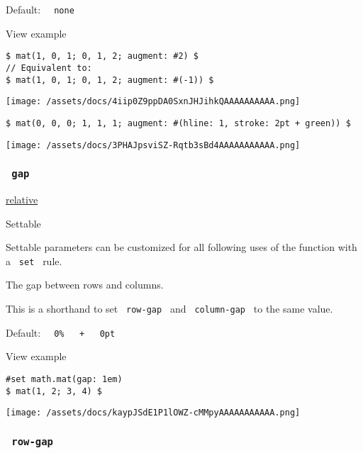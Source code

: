 Default: \texttt{\ }{\texttt{\ none\ }}\texttt{\ }


View example

\begin{verbatim}
$ mat(1, 0, 1; 0, 1, 2; augment: #2) $
// Equivalent to:
$ mat(1, 0, 1; 0, 1, 2; augment: #(-1)) $
\end{verbatim}

\texttt{[image: /assets/docs/4iip0Z9ppDA0SxnJHJihkQAAAAAAAAAA.png]}

\begin{verbatim}
$ mat(0, 0, 0; 1, 1, 1; augment: #(hline: 1, stroke: 2pt + green)) $
\end{verbatim}

\texttt{[image: /assets/docs/3PHAJpsviSZ-Rqtb3sBd4AAAAAAAAAAA.png]}

\subsubsection{\texorpdfstring{\texttt{\ gap\ }}{ gap }}\label{parameters-gap}

\href{/docs/reference/layout/relative/}{relative}

{{ Settable }}

\label{parameters-gap-settable-tooltip}
Settable parameters can be customized for all following uses of the
function with a \texttt{\ set\ } rule.

The gap between rows and columns.

This is a shorthand to set \texttt{\ row-gap\ } and
\texttt{\ column-gap\ } to the same value.

Default:
\texttt{\ }{\texttt{\ 0\%\ }}\texttt{\ }{\texttt{\ +\ }}\texttt{\ }{\texttt{\ 0pt\ }}\texttt{\ }


View example

\begin{verbatim}
#set math.mat(gap: 1em)
$ mat(1, 2; 3, 4) $
\end{verbatim}

\texttt{[image: /assets/docs/kaypJSdE1P1lOWZ-cMMpyAAAAAAAAAAA.png]}

\subsubsection{\texorpdfstring{\texttt{\ row-gap\ }}{ row-gap }}\label{parameters-row-gap}

